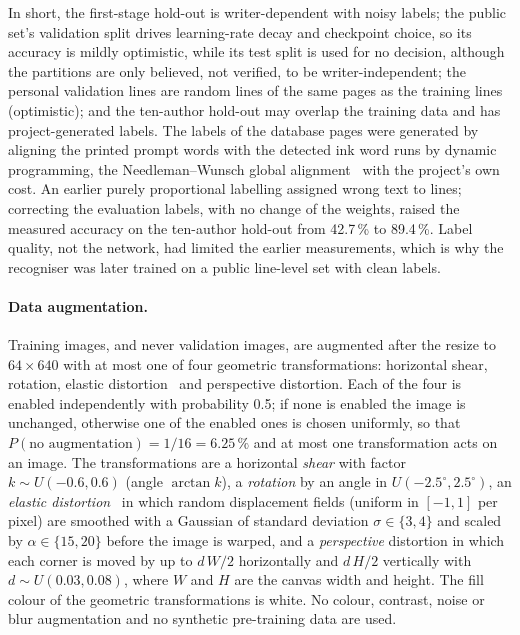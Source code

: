 In short, the first-stage hold-out is writer-dependent with noisy labels; the public set's validation split drives learning-rate decay and checkpoint choice, so its accuracy is mildly optimistic, while its test split is used for no decision, although the partitions are only believed, not verified, to be writer-independent; the personal validation lines are random lines of the same pages as the training lines (optimistic); and the ten-author hold-out may overlap the training data and has project-generated labels.
The labels of the database pages were generated by aligning the printed prompt words with the detected ink word runs by dynamic programming, the Needleman--Wunsch global alignment~\cite{needleman1970} with the project's own cost. An earlier purely proportional labelling assigned wrong text to lines; correcting the evaluation labels, with no change of the weights, raised the measured accuracy on the ten-author hold-out from 42.7\,\% to 89.4\,\%.
Label quality, not the network, had limited the earlier measurements, which is why the recogniser was later trained on a public line-level set with clean labels.

\paragraph{Data augmentation.}
Training images, and never validation images, are augmented after the resize to $64\times640$ with at most one of four geometric transformations: horizontal shear, rotation, elastic distortion~\cite{simard2003} and perspective distortion.
Each of the four is enabled independently with probability 0.5; if none is enabled the image is unchanged, otherwise one of the enabled ones is chosen uniformly, so that $P(\text{no augmentation})=1/16=6.25\,\%$ and at most one transformation acts on an image.
The transformations are a horizontal \emph{shear} with factor $k\sim U(-0.6,0.6)$ (angle $\arctan k$), a \emph{rotation} by an angle in $U(-2.5^\circ,2.5^\circ)$, an \emph{elastic distortion}~\cite{simard2003} in which random displacement fields (uniform in $[-1,1]$ per pixel) are smoothed with a Gaussian of standard deviation $\sigma\in\{3,4\}$ and scaled by $\alpha\in\{15,20\}$ before the image is warped, and a \emph{perspective} distortion in which each corner is moved by up to $d\,W/2$ horizontally and $d\,H/2$ vertically with $d\sim U(0.03,0.08)$, where $W$ and $H$ are the canvas width and height.
The fill colour of the geometric transformations is white.
No colour, contrast, noise or blur augmentation and no synthetic pre-training data are used.

